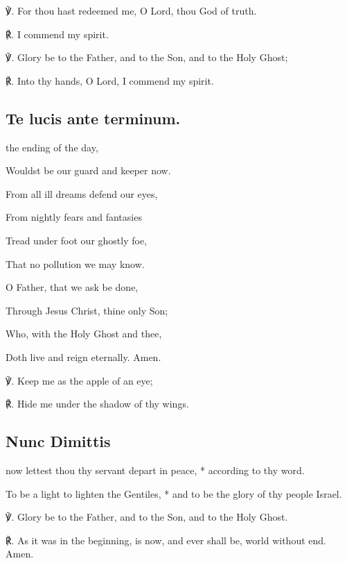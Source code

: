 \begin{multicols}{2}
℣. For thou hast redeemed me, O Lord, thou God of truth.

℟. I commend my spirit.

℣. Glory be to the Father, and to the Son, and to the Holy Ghost;

℟. Into thy hands, O Lord, I commend my spirit.

\newcolumn

\subsection{Te lucis ante terminum.}
\begin{hangparas}{1.25em}{1}
 the ending of the day,\par
{}
\par\noindent
Wouldst be our guard and keeper now.\\
\par\noindent
From all ill dreams defend our eyes,\par\noindent
From nightly fears and fantasies\par\noindent
Tread under foot our ghostly foe,\par\noindent
That no pollution we may know.\\
\par\noindent
O Father, that we ask be done,\par\noindent
Through Jesus Christ, thine only Son;\par\noindent
Who, with the Holy Ghost and thee,\par\noindent
Doth live and reign eternally. Amen.\\
\end{hangparas}
℣. Keep me as the apple of an eye;

℟. Hide me under the shadow of thy wings.

\subsection{Nunc Dimittis}

 {} now lettest thou thy servant depart in peace, * according to thy word.\par
    To be a light to lighten the Gentiles, * and to be the glory of thy people Israel.\par
	℣. Glory be to the Father, and to the Son, and to the Holy Ghost.\par
	℟. As it was in the beginning, is now, and ever shall be, world without end. Amen.


\end{multicols}
